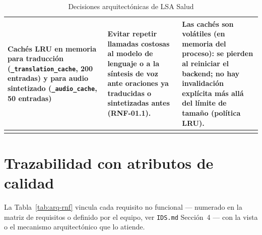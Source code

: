\begin{longtable}{>{\raggedright\arraybackslash}p{4.25cm} >{\raggedright\arraybackslash}p{5.2cm} >{\raggedright\arraybackslash}p{5.2cm}}
    Cachés LRU en memoria para traducción (\texttt{\_translation\_cache},
    200 entradas) y para audio sintetizado (\texttt{\_audio\_cache}, 50
    entradas) &
    Evitar repetir llamadas costosas al modelo de lenguaje o a la síntesis
    de voz ante oraciones ya traducidas o sintetizadas antes (RNF-01.1). &
    Las cachés son volátiles (en memoria del proceso): se pierden al
    reiniciar el backend; no hay invalidación explícita más allá del límite
    de tamaño (política LRU). \\
    \bottomrule
    \caption{Decisiones arquitectónicas de LSA Salud}
    \label{tab:arq-decisiones}
\end{longtable}

\section{Trazabilidad con atributos de calidad}
\label{sec:trazabilidad-rnf}

La Tabla~\ref{tab:arq-rnf} vincula cada requisito no funcional --- numerado
en la matriz de requisitos o definido por el equipo, ver \texttt{IDS.md}
Sección~4 --- con la vista o el mecanismo arquitectónico que lo atiende.


